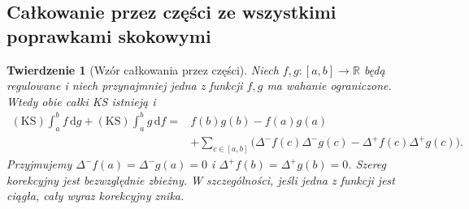 \documentclass[11pt,a4paper]{article}
\numberwithin{equation}{section}
\theoremstyle{plain}
\newtheorem{twierdzenie}{Twierdzenie}[section]
\theoremstyle{definition}
\theoremstyle{remark}
\newcommand{\R}{\mathbb R}
\newcommand{\KS}{\mathrm{KS}}
\begin{document}
\subsection*{Całkowanie przez części ze wszystkimi poprawkami skokowymi}
\begin{twierdzenie}[Wzór całkowania przez części]
\label{tw:ks-ibp}
Niech $f,g:[a,b]\to\R$ będą regulowane i niech przynajmniej jedna z funkcji $f,g$ ma wahanie ograniczone. Wtedy obie całki KS istnieją i
\[
 \begin{aligned}
 (\KS)\int_a^b f\,\mathrm dg+(\KS)\int_a^b g\,\mathrm df
 ={}&f(b)g(b)-f(a)g(a)\\
 &+\sum_{c\in[a,b]}\bigl(\Delta^-f(c)\Delta^-g(c)
 -\Delta^+f(c)\Delta^+g(c)\bigr).
 \end{aligned}
\]
Przyjmujemy $\Delta^-f(a)=\Delta^-g(a)=0$ i $\Delta^+f(b)=\Delta^+g(b)=0$. Szereg korekcyjny jest bezwzględnie zbieżny. W szczególności, jeśli jedna z funkcji jest ciągła, cały wyraz korekcyjny znika.
\end{twierdzenie}
\end{document}
